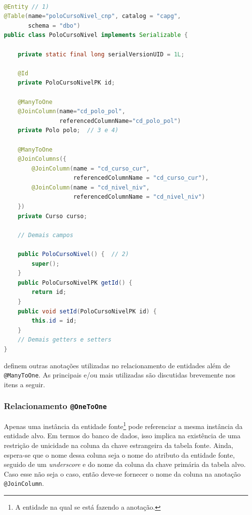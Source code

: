 \documentclass[
  10.5pt,				  %
	openright,			%
	twoside,			  %
  a5paper,
  chapter=TITLE,	%
	section=TITLE,	%
  hyphens,        %
	english,        %
	brazil          %
]{abntex2}
\begin{document}
\begin{lstlisting}[language=java, caption={Entidade PoloCursoNivel e seus mapeamentos.}, label={alg:entity_pcn}]

@Entity // 1)
@Table(name="poloCursoNivel_cnp", catalog = "capg",
       schema = "dbo")
public class PoloCursoNivel implements Serializable {

    private static final long serialVersionUID = 1L;

    @Id
    private PoloCursoNivelPK id;

    @ManyToOne
    @JoinColumn(name="cd_polo_pol",
                referencedColumnName="cd_polo_pol")
    private Polo polo;  // 3 e 4)

    @ManyToOne
    @JoinColumns({
        @JoinColumn(name = "cd_curso_cur",
                    referencedColumnName = "cd_curso_cur"),
        @JoinColumn(name = "cd_nivel_niv",
                    referencedColumnName = "cd_nivel_niv")
    })
    private Curso curso;

    // Demais campos

    public PoloCursoNivel() {  // 2)
        super();
    }
    public PoloCursoNivelPK getId() {
        return id;
    }
    public void setId(PoloCursoNivelPK id) {
        this.id = id;
    }
    // Demais getters e setters
}

\end{lstlisting}


 definem outras anotações utilizadas no relacionamento de entidades além de \texttt{@ManyToOne}. As principais e/ou mais utilizadas são discutidas brevemente nos itens a seguir.

\subsubsection{Relacionamento \texttt{@OneToOne}}
Apenas uma instância da entidade fonte\footnote{A entidade na qual se está fazendo a anotação.} pode referenciar a mesma instância da entidade alvo. Em termos do banco de dados, isso implica na existência de uma restrição de unicidade na coluna da chave estrangeira da tabela fonte. Ainda, espera-se que o nome dessa coluna seja o nome do atributo da entidade fonte, seguido de um \emph{underscore} e do nome da coluna da chave primária da tabela alvo. Caso esse não seja o caso, então deve-se fornecer o nome da coluna na anotação \texttt{@JoinColumn}.
\end{document}
